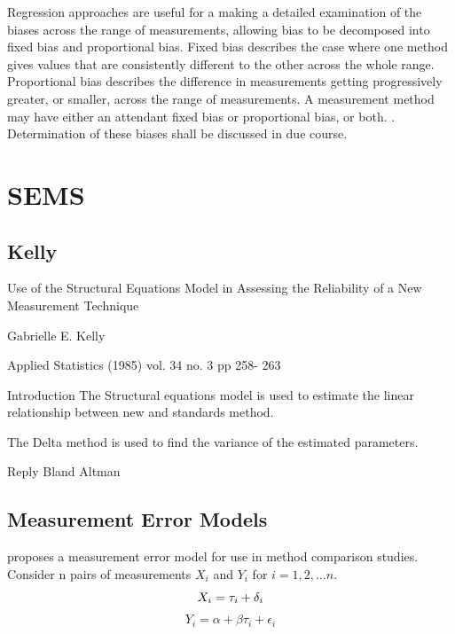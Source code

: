 \documentclass[12pt, a4paper]{report}
\theoremstyle{plain}
\theoremstyle{definition}
\theoremstyle{remark}
\begin{document}
	Regression approaches are useful for a making a detailed examination of the biases across the range of measurements, allowing bias to be decomposed into fixed bias and proportional bias.
	Fixed bias describes the case where one method gives values that are consistently different
	to the other across the whole range. Proportional
	bias describes the difference in measurements getting progressively greater, or smaller, across the range of measurements. A measurement method may have either an attendant fixed bias or proportional bias, or both. \citep{ludbrook}. Determination of these biases shall be discussed in due course.
\chapter{SEMS}





\section{Kelly}

Use of the Structural Equations Model in Assessing the Reliability of a New Measurement Technique

Gabrielle E. Kelly

Applied Statistics (1985) vol. 34 no. 3 pp 258- 263

Introduction
The Structural equations model is used to estimate the linear relationship between new and standards method.

The Delta method is used to find the variance of the estimated parameters.

Reply
Bland Altman 



\section{Measurement Error Models}

\citet{DunnSEME} proposes a measurement error model for use in
method comparison studies. Consider n pairs of measurements
$X_{i}$ and $Y_{i}$ for $i=1,2,...n$.
\begin{equation}
X_{i} = \tau_{i}+\delta_{i}\\
\end{equation}
\begin{equation}
Y_{i} = \alpha +\beta\tau_{i}+\epsilon_{i} \nonumber
\end{equation}
\end{document}
